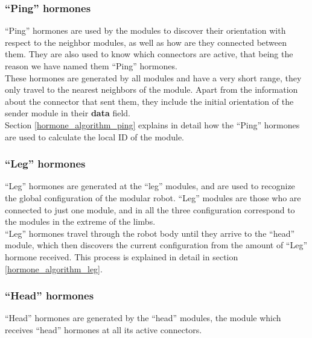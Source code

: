 \subsubsection{``Ping'' hormones}
\label{hormone_types_ping}

``Ping'' hormones are used by the modules to discover their orientation with respect to the neighbor modules, as well as how are they connected between them. They are also used to know which connectors are active, that being the reason we have named them ``Ping'' hormones.\\

These hormones are generated by all modules and have a very short range, they only travel to the nearest neighbors of the module. Apart from the information about the connector that sent them, they include the initial orientation of the sender module in their \textbf{data} field.\\

Section \ref{hormone_algorithm_ping} explains in detail how the ``Ping'' hormones are used to calculate the local ID of the module.\\ 


\subsubsection{``Leg'' hormones}
\label{hormone_types_leg}

``Leg'' hormones are generated at the ``leg'' modules, and are used to recognize the global configuration of the modular robot. ``Leg'' modules are those who are connected to just one module, and in all the three configuration correspond to the modules in the extreme of the limbs.\\

``Leg'' hormones travel through the robot body until they arrive to the ``head'' module, which then discovers the current configuration from the amount of ``Leg'' hormone received. This process is explained in detail in section \ref{hormone_algorithm_leg}.\\


\subsubsection{``Head'' hormones}
\label{hormone_types_head}

``Head'' hormones are generated by the ``head'' modules, the module which receives ``head'' hormones at all its active connectors.\\

